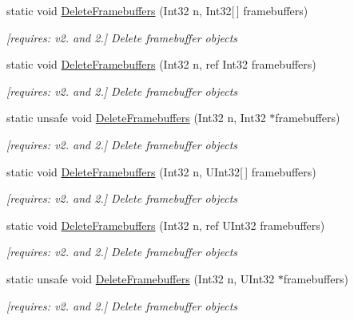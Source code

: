 \begin{DoxyCompactItemize}
static void \hyperlink{class_open_t_k_1_1_graphics_1_1_e_s20_1_1_g_l_a0b1e99bddcde857a225ead00ef087a92}{Delete\-Framebuffers} (Int32 n, Int32\mbox{[}$\,$\mbox{]} framebuffers)
\begin{DoxyCompactList}\small\item\em \mbox{[}requires\-: v2. and 2.\mbox{]} Delete framebuffer objects \end{DoxyCompactList}\item 
static void \hyperlink{class_open_t_k_1_1_graphics_1_1_e_s20_1_1_g_l_ab88cc608620a13914b3ebaaecd4c9d32}{Delete\-Framebuffers} (Int32 n, ref Int32 framebuffers)
\begin{DoxyCompactList}\small\item\em \mbox{[}requires\-: v2. and 2.\mbox{]} Delete framebuffer objects \end{DoxyCompactList}\item 
static unsafe void \hyperlink{class_open_t_k_1_1_graphics_1_1_e_s20_1_1_g_l_a8d97886daa5ec2e8b282b7ad60e02368}{Delete\-Framebuffers} (Int32 n, Int32 $\ast$framebuffers)
\begin{DoxyCompactList}\small\item\em \mbox{[}requires\-: v2. and 2.\mbox{]} Delete framebuffer objects \end{DoxyCompactList}\item 
static void \hyperlink{class_open_t_k_1_1_graphics_1_1_e_s20_1_1_g_l_aa20b099620a80add5d11c536762ab171}{Delete\-Framebuffers} (Int32 n, U\-Int32\mbox{[}$\,$\mbox{]} framebuffers)
\begin{DoxyCompactList}\small\item\em \mbox{[}requires\-: v2. and 2.\mbox{]} Delete framebuffer objects \end{DoxyCompactList}\item 
static void \hyperlink{class_open_t_k_1_1_graphics_1_1_e_s20_1_1_g_l_a6ad5d2c00541aa18c5abe5dbbaeb9266}{Delete\-Framebuffers} (Int32 n, ref U\-Int32 framebuffers)
\begin{DoxyCompactList}\small\item\em \mbox{[}requires\-: v2. and 2.\mbox{]} Delete framebuffer objects \end{DoxyCompactList}\item 
static unsafe void \hyperlink{class_open_t_k_1_1_graphics_1_1_e_s20_1_1_g_l_ab9f3d8a830506229617a67230abd94fc}{Delete\-Framebuffers} (Int32 n, U\-Int32 $\ast$framebuffers)
\begin{DoxyCompactList}\small\item\em \mbox{[}requires\-: v2. and 2.\mbox{]} Delete framebuffer objects \end{DoxyCompactList}\item 

\end{DoxyCompactItemize}
